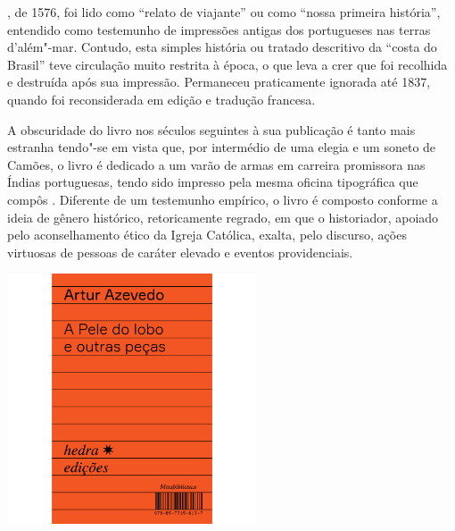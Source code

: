 \hspace*{-7cm}\hrulefill\hspace*{-7cm}

\medskip

, de 1576, foi lido como “relato de viajante” ou como “nossa primeira história”, entendido como testemunho de impressões antigas dos portugueses nas terras d’além"-mar. Contudo, esta simples história ou tratado descritivo da “costa do Brasil” teve circulação muito restrita à época, o que leva a crer que foi recolhida e destruída após sua impressão. Permaneceu praticamente ignorada até 1837, quando foi reconsiderada em edição e tradução francesa.

A obscuridade do livro nos séculos seguintes à sua publicação é tanto mais estranha tendo"-se em vista que, por intermédio de uma elegia e um soneto de Camões, o livro é dedicado a um varão de armas em carreira promissora nas Índias portuguesas, tendo sido impresso pela mesma oficina tipográfica que compôs {}. Diferente de um testemunho empírico, o livro é composto conforme a ideia de gênero histórico, retoricamente regrado, em que o historiador, apoiado pelo aconselhamento ético da Igreja Católica, exalta, pelo discurso, ações virtuosas de pessoas de caráter elevado e eventos providenciais.

\vfill

\hspace*{-.4cm}\begin{minipage}[c]{.6\linewidth}
\small{
{}}
\end{minipage}

\pagebreak

\begin{center}
\hspace*{.5cm}\includegraphics[width=74mm]{./grid/azevedo.jpg}
\end{center}

